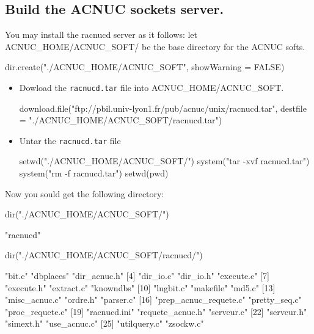 \documentclass{article}
\begin{document}
\subsection{Build the ACNUC sockets server.}

You may install the racnucd server as it follows:
let ACNUC\_HOME/ACNUC\_SOFT/ be the base directory for the ACNUC softs.

\begin{Schunk}
\begin{Sinput}
 dir.create("./ACNUC_HOME/ACNUC_SOFT", showWarning = FALSE)
\end{Sinput}
\end{Schunk}

\begin{itemize}
\item Dowload the \texttt{racnucd.tar} file into ACNUC\_HOME/ACNUC\_SOFT.

\begin{Schunk}
\begin{Sinput}
 download.file("ftp://pbil.univ-lyon1.fr/pub/acnuc/unix/racnucd.tar", 
     destfile = "./ACNUC_HOME/ACNUC_SOFT/racnucd.tar")
\end{Sinput}
\end{Schunk}

\item Untar the \texttt{racnucd.tar} file 

\begin{Schunk}
\begin{Sinput}
 setwd("./ACNUC_HOME/ACNUC_SOFT/")
 system("tar -xvf racnucd.tar")
 system("rm -f racnucd.tar")
 setwd(pwd)
\end{Sinput}
\end{Schunk}

\end{itemize}
Now you sould get the following directory:


\begin{Schunk}
\begin{Sinput}
 dir("./ACNUC_HOME/ACNUC_SOFT/")
\end{Sinput}
\begin{Soutput}
[1] "racnucd"
\end{Soutput}
\begin{Sinput}
 dir("./ACNUC_HOME/ACNUC_SOFT/racnucd/")
\end{Sinput}
\begin{Soutput}
 [1] "bit.c"                "dbplaces"             "dir_acnuc.h"         
 [4] "dir_io.c"             "dir_io.h"             "execute.c"           
 [7] "execute.h"            "extract.c"            "knowndbs"            
[10] "lngbit.c"             "makefile"             "md5.c"               
[13] "misc_acnuc.c"         "ordre.h"              "parser.c"            
[16] "prep_acnuc_requete.c" "pretty_seq.c"         "proc_requete.c"      
[19] "racnucd.ini"          "requete_acnuc.h"      "serveur.c"           
[22] "serveur.h"            "simext.h"             "use_acnuc.c"         
[25] "utilquery.c"          "zsockw.c"            
\end{Soutput}
\end{Schunk}
\end{document}
